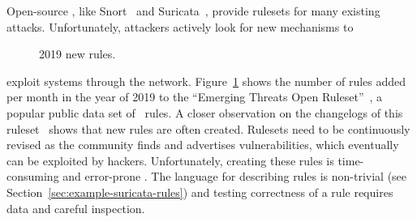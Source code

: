\documentclass[conference]{IEEEtran}
\begin{document}
Open-source \nids{}, like Snort~\cite{snort} and
Suricata~\cite{suricata}, provide rulesets for many existing
attacks. Unfortunately, attackers actively look for new mechanisms to
\begin{figure}
    \vspace{-2ex}  
    \centering
    \vspace{-5ex}
    \caption{\label{fig:distribution-rules-per-month}2019 new rules.}
\end{figure}
exploit systems through the
network. Figure~\ref{fig:distribution-rules-per-month} shows the
number of rules added per month in the year of 2019 to the ``Emerging
Threats Open Ruleset''~\cite{emerging-threats-open}, a popular public
data set of \suri\ rules. A closer observation on the
changelogs of this ruleset~\cite{emerging-threats-changelogs} shows that new rules are
often created.  Rulesets need to be continuously revised as the
community finds and advertises vulnerabilities, which eventually can be exploited by hackers. 
Unfortunately, creating these rules is
time-consuming and error-prone . The language for describing rules is
non-trivial (see Section~\ref{sec:example-suricata-rules}) and testing
correctness of a rule requires data and careful inspection.

\end{document}

